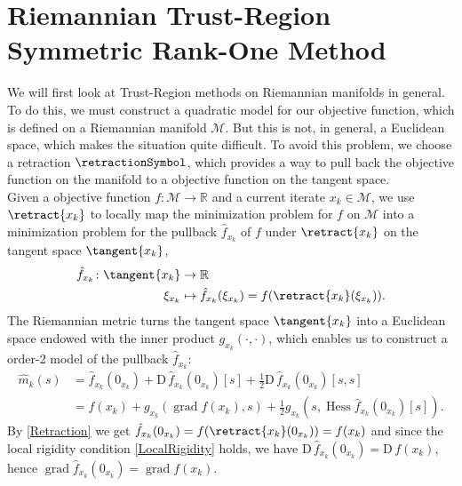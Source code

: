 \section{Riemannian Trust-Region Symmetric Rank-One Method}


We will first look at Trust-Region methods on Riemannian manifolds in general. To do this, we must construct a quadratic model for our objective function, which is defined on a Riemannian manifold $\mathcal{M}$. But this is not, in general, a Euclidean space, which makes the situation quite difficult. To avoid this problem, we choose a retraction $\retractionSymbol$, which provides a way to pull back the objective function on the manifold to a objective function on the tangent space. \\
Given a objective function $f \colon \mathcal{M} \to \mathbb{R}$ and a current iterate $x_k \in \mathcal{M}$, we use $\retract{x_k}$ to locally map the minimization problem for $f$ on $\mathcal{M}$ into a minimization problem for the pullback $\hat{f}_{x_k}$ of $f$ under $\retract{x_k}$ on the tangent space $\tangent{x_k}$,
\begin{align*}
    \hat{f}_{x_k} \colon \tangent{x_k} & \to \mathbb{R} \\
    \xi_{x_k} & \mapsto \hat{f}_{x_k} (\xi_{x_k}) = f(\retract{x_k}(\xi_{x_k})).
\end{align*}
The Riemannian metric turns the tangent space $\tangent{x_k}$ into a Euclidean space endowed with the inner product $g_{x_k}(\cdot, \cdot)$, which enables us to construct a order-2 model of the pullback $\hat{f}_{x_k}$:
\begin{align*}
    \hat{m}_k( s ) & = \hat{f}_{x_k}(0_{x_k}) + \mathrm{D} \, \hat{f}_{x_k}(0_{x_k}) [s] + \frac{1}{2} \mathrm{D} \, \hat{f}_{x_k}(0_{x_k}) [s, s] \\
    & = f(x_k) + g_{x_k}(\operatorname{grad} f(x_k), s ) + \frac{1}{2} g_{x_k}( s, \operatorname{Hess} \hat{f}_{x_k}(0_{x_k}) [s]).
\end{align*}
By \cref{Retraction} we get $\hat{f}_{x_k}(0_{x_k}) = f(\retract{x_k}(0_{x_k})) = f(x_k)$ and since the local rigidity condition \cref{LocalRigidity} holds, we have $\mathrm{D} \, \hat{f}_{x_k}(0_{x_k}) = \mathrm{D} \, f(x_k)$, hence $\operatorname{grad} \hat{f}_{x_k}(0_{x_k}) = \operatorname{grad} f(x_k)$. \\
